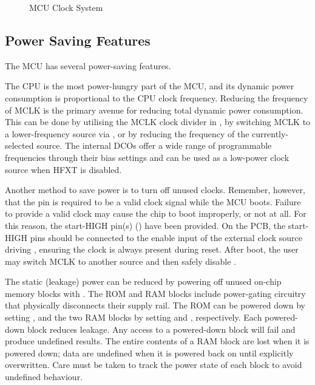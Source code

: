 \begin{figure}[htpb]

\caption{MCU Clock System}
\label{fig:mcu-clock-system}
\end{figure}



\subsection{Power Saving Features} \label{ss:power-saving}
The MCU has several power-saving features.

The CPU is the most power-hungry part of the MCU, and its dynamic power consumption is proportional to the CPU clock frequency. Reducing the frequency of MCLK is the primary avenue for reducing total dynamic power consumption. This can be done by utilising the MCLK clock divider in , by switching MCLK to a lower-frequency source via , or by reducing the frequency of the currently-selected source. The internal DCOs offer a wide range of programmable frequencies through their bias settings and can be used as a low-power clock source when HFXT is disabled.

Another method to save power is to turn off unused clocks. Remember, however, that the  pin is required to be a valid clock signal while the MCU boots. Failure to provide a valid clock may cause the chip to boot improperly, or not at all. For this reason, the start-HIGH pin(s) () have been provided. On the PCB, the start-HIGH pins should be connected to the enable input of the external clock source driving , ensuring the clock is always present during reset. After boot, the user may switch MCLK to another source and then safely disable .

The static (leakage) power can be reduced by powering off unused on-chip memory blocks with . The ROM and RAM blocks include power-gating circuitry that physically disconnects their supply rail. The ROM can be powered down by setting , and the two RAM blocks by setting  and , respectively. Each powered-down block reduces leakage. Any access to a powered-down block will fail and produce undefined results. The entire contents of a RAM block are lost when it is powered down; data are undefined when it is powered back on until explicitly overwritten. Care must be taken to track the power state of each block to avoid undefined behaviour.



